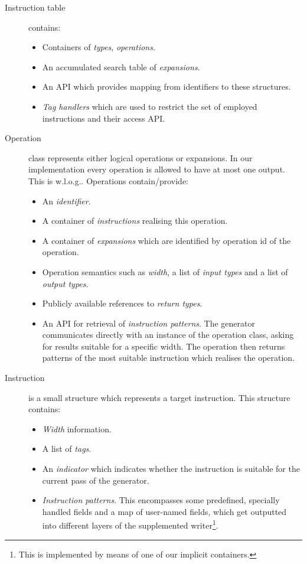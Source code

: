 \begin{description}
  \item[Instruction table] contains:
    \begin{itemize}
      \item Containers of \emph{types}, \emph{operations}.
      \item An accumulated search table of \emph{expansions}.
      \item An API which provides mapping from identifiers to these structures.
      \item \emph{Tag handlers} which are used to restrict the set of employed instructions and their access API.
    \end{itemize}
  \item[Operation] class represents either logical operations or expansions. In our implementation every operation is allowed to have at most one output. This is w.l.o.g.. Operations contain/provide:
    \begin{itemize}
      \item An \emph{identifier}.
      \item A container of \emph{instructions} realising this operation.
      \item A container of \emph{expansions} which are identified by operation id of the operation.
      \item Operation semantics such as \emph{width}, a list of \emph{input types} and a list of \emph{output types}.
      \item Publicly available references to \emph{return types}.
      \item An API for retrieval of \emph{instruction patterns}. The generator communicates directly with an instance of the operation class, asking for results suitable for a specific width. The operation then returns patterns of the most suitable instruction which realises the operation.
    \end{itemize} 
  \item[Instruction] is a small structure which represents a target instruction. This structure contains:
    \begin{itemize}
      \item \emph{Width} information.
      \item A list of \emph{tags}.
      \item An \emph{indicator} which indicates whether the instruction is suitable for the current pass of the generator.
      \item \emph{Instruction patterns}. This encompasses some predefined, specially handled fields and a map of user-named fields, which get outputted into different layers of the supplemented writer\footnote{This is implemented by means of one of our implicit containers.}.

\end{itemize}
\end{description}
